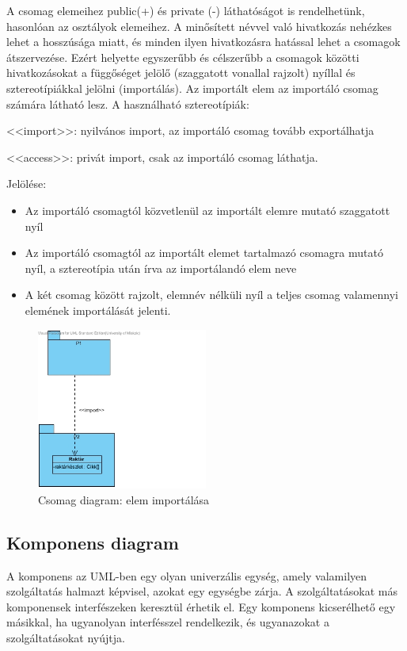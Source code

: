 \documentclass[margin=0px]{article}
\begin{document}
A csomag elemeihez public(+) és private (-) láthatóságot is rendelhetünk, hasonlóan az osztályok elemeihez.
A minősített névvel való hivatkozás nehézkes lehet a hosszúsága miatt, és minden ilyen hivatkozásra hatással lehet a csomagok átszervezése. Ezért helyette egyszerűbb és célszerűbb a csomagok közötti hivatkozásokat a függőséget jelölő (szaggatott vonallal rajzolt) nyíllal és sztereotípiákkal jelölni (importálás). Az importált elem az importáló csomag számára látható lesz. A használható sztereotípiák:

<<import>>: nyilvános import, az importáló csomag tovább exportálhatja

<<access>>: privát import, csak az importáló csomag láthatja.

Jelölése:
\begin{itemize}
    \item Az importáló csomagtól közvetlenül az importált elemre mutató szaggatott nyíl
    \item Az importáló csomagtól az importált elemet tartalmazó csomagra mutató nyíl, a sztereotípia után írva az importálandó elem neve
    \item A két csomag között rajzolt, elemnév nélküli nyíl a teljes csomag valamennyi elemének importálását jelenti.
\end{itemize}

\begin{figure}[H]
    \centering
    \includegraphics[width=0.5\textwidth]{img/csomag_diagram.jpg}
    \caption{Csomag diagram: elem importálása}
\end{figure}

\subsection{Komponens diagram}
A komponens az UML-ben egy olyan univerzális egység, amely valamilyen szolgáltatás halmazt képvisel, azokat egy egységbe zárja. A szolgáltatásokat más komponensek interfészeken keresztül érhetik el. Egy komponens kicserélhető egy másikkal, ha ugyanolyan interfésszel rendelkezik, és ugyanazokat a szolgáltatásokat nyújtja.
\end{document}
